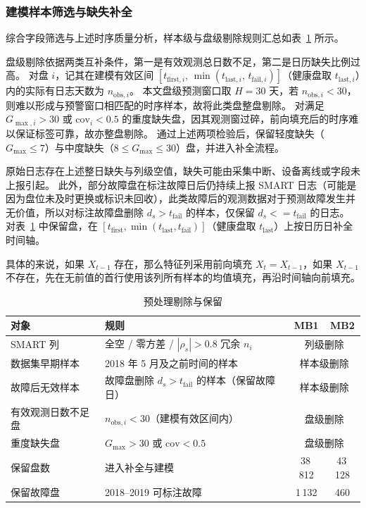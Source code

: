 \subsubsection{建模样本筛选与缺失补全}
\label{sec:chap3-imputation}

综合字段筛选与上述时序质量分析，样本级与盘级剔除规则汇总如表~\ref{tab:preprocessing-removal} 所示。

盘级剔除依据两类互补条件，第一是有效观测总日数不足，第二是日历缺失比例过高。
对盘 $i$，记其在建模有效区间 $[t_{\mathrm{first},i},\,\min(t_{\mathrm{last},i},\,t_{\mathrm{fail},i})]$（健康盘取 $t_{\mathrm{last},i}$）内的实际有日志天数为 $n_{\mathrm{obs},i}$。
本文盘级预测窗口取 $H=30$ 天，若 $n_{\mathrm{obs},i}<30$，则难以形成与预警窗口相匹配的时序样本，故将此类盘整盘剔除。
对满足 $G_{\max,i}>30$ 或 $\mathrm{cov}_i<0.5$ 的重度缺失盘，因其观测窗过碎，前向填充后的时序难以保证标签可靠，故亦整盘剔除。
通过上述两项检验后，保留轻度缺失（$G_{\max}\le 7$）与中度缺失（$8\le G_{\max}\le 30$）盘，并进入补全流程。

原始日志存在上述整日缺失与列级空值，缺失可能由采集中断、设备离线或字段未上报引起。
此外，部分故障盘在标注故障日后仍持续上报 SMART 日志（可能是因为盘位未及时更换或标识未回收），此类故障后的观测数据对于预测故障发生并无价值，所以对标注故障盘删除 $d_s>t_{\mathrm{fail}}$ 的样本，仅保留 $d_s<=t_{\mathrm{fail}}$ 的日志。
对表~\ref{tab:preprocessing-removal} 中保留盘，在 $[t_{\mathrm{first}},\min(t_{\mathrm{last}},t_{\mathrm{fail}})]$（健康盘取 $t_{\mathrm{last}}$）上按日历日补全时间轴。

具体的来说，如果 $X_{t-1}$ 存在，那么特征列采用前向填充 $X_t=X_{t-1}$，如果 $X_{t-1}$ 不存在，先在无前值的首行使用该列所有样本的均值填充，再沿时间轴向前填充。


\begin{table}[htbp]
    \centering
    \caption{\label{tab:preprocessing-removal}预处理剔除与保留}
    \begin{tabular}{l l c c}
        \toprule
        对象 & 规则 & MB1 & MB2 \\
        \midrule
        SMART 列 & 全空 / 零方差 / $|\rho_s|>0.8$ 冗余 $n_i$ & \multicolumn{2}{c}{列级删除} \\
        数据集早期样本 & 2018 年 5 月及之前时间的样本 & \multicolumn{2}{c}{样本级删除}\\
        故障后无效样本 & 故障盘删除 $d_s>t_{\mathrm{fail}}$ 的样本（保留故障日） & \multicolumn{2}{c}{样本级删除} \\
        有效观测日数不足盘 & $n_{\mathrm{obs},i}<30$（建模有效区间内） & \multicolumn{2}{c}{盘级删除} \\ 
        重度缺失盘 & $G_{\max}>30$ 或 $\mathrm{cov}<0.5$ & \multicolumn{2}{c}{盘级删除} \\
        保留盘数 & 进入补全与建模 & 38\,812 & 43\,128 \\
        保留故障盘 & 2018--2019 可标注故障 & 1\,132 & 460 \\
        \bottomrule
    \end{tabular}
\end{table}


